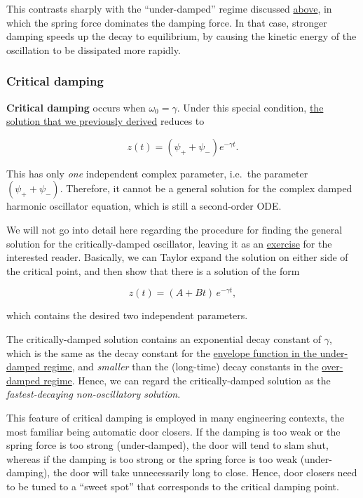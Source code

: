 \documentclass[11pt]{article}
\begin{document}
This contrasts sharply with the ``under-damped'' regime discussed
\protect\hyperlink{underdamped}{above}, in which the spring force
dominates the damping force. In that case, stronger damping speeds up
the decay to equilibrium, by causing the kinetic energy of the
oscillation to be dissipated more rapidly.

    \subsubsection{Critical damping}\label{critical-damping}

\textbf{Critical damping} occurs when \(\omega_0 = \gamma\). Under this
special condition, \protect\hyperlink{ansatz}{the solution that we
previously derived} reduces to

\[z(t) = \left(\psi_+ + \psi_-\right) e^{-\gamma t}.\]

This has only \emph{one} independent complex parameter, i.e.~the
parameter \((\psi_+ + \psi_-)\). Therefore, it cannot be a general
solution for the complex damped harmonic oscillator equation, which is
still a second-order ODE.

We will not go into detail here regarding the procedure for finding the
general solution for the critically-damped oscillator, leaving it as an
\protect\hyperlink{exercises}{exercise} for the interested reader.
Basically, we can Taylor expand the solution on either side of the
critical point, and then show that there is a solution of the form

\[z(t) = \left(A + B t\right)\, e^{-\gamma t},\]

which contains the desired two independent parameters.

The critically-damped solution contains an exponential decay constant of
\(\gamma\), which is the same as the decay constant for the
\protect\hyperlink{underdamped}{envelope function in the under-damped
regime}, and \emph{smaller} than the (long-time) decay constants in the
\protect\hyperlink{overdamped}{over-damped regime}. Hence, we can regard
the critically-damped solution as the \emph{fastest-decaying
non-oscillatory solution}.

This feature of critical damping is employed in many engineering
contexts, the most familiar being automatic door closers. If the damping
is too weak or the spring force is too strong (under-damped), the door
will tend to slam shut, whereas if the damping is too strong or the
spring force is too weak (under-damping), the door will take
unnecessarily long to close. Hence, door closers need to be tuned to a
``sweet spot'' that corresponds to the critical damping point.
\end{document}
